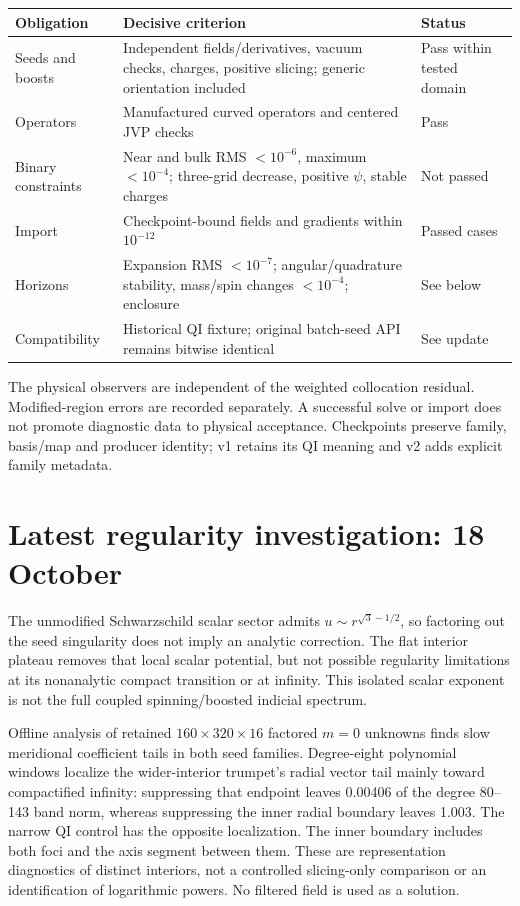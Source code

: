 \documentclass[aps,prd,preprint,notitlepage,nofootinbib]{revtex4-2}
\begin{document}
\begin{center}\footnotesize
\begin{tabularx}{\linewidth}{@{}lXl@{}}
\toprule
Obligation & Decisive criterion & Status\\\midrule
Seeds and boosts & Independent fields/derivatives, vacuum checks, charges,
positive slicing; generic orientation included & Pass within tested domain\\
Operators & Manufactured curved operators and centered JVP checks & Pass\\
Binary constraints & Near and bulk RMS $<10^{-6}$, maximum $<10^{-4}$;
three-grid decrease, positive $\psi$, stable charges & Not passed\\
Import & Checkpoint-bound fields and gradients within $10^{-12}$ & Passed cases\\
Horizons & Expansion RMS $<10^{-7}$; angular/quadrature stability,
mass/spin changes $<10^{-4}$; enclosure & See below\\
Compatibility & Historical QI fixture; original batch-seed API remains bitwise identical & See update\\
\bottomrule
\end{tabularx}
\end{center}
The physical observers are independent of the weighted collocation residual.
Modified-region errors are recorded separately. A successful solve or import
does not promote diagnostic data to physical acceptance. Checkpoints preserve
family, basis/map and producer identity; v1 retains its QI meaning and v2 adds
explicit family metadata.

\section{Latest regularity investigation: 18 October}
The unmodified Schwarzschild scalar sector admits
$u\sim r^{\sqrt3-1/2}$, so factoring out the seed singularity does not imply
an analytic correction. The flat interior plateau removes that local scalar
potential, but not possible regularity limitations at its nonanalytic compact
transition or at infinity. This isolated scalar exponent is not the full
coupled spinning/boosted indicial spectrum.

Offline analysis of retained $160\times320\times16$ factored $m=0$ unknowns
finds slow meridional coefficient tails in both seed families. Degree-eight
polynomial windows localize the wider-interior trumpet's radial vector tail
mainly toward compactified infinity: suppressing that endpoint leaves 0.00406
of the degree 80--143 band norm, whereas suppressing the inner radial boundary
leaves 1.003. The narrow QI control has the opposite localization. The inner
boundary includes both foci and the axis segment between them. These are
representation diagnostics of distinct interiors, not a controlled slicing-only
comparison or an identification of logarithmic powers. No filtered field is
used as a solution.
\end{document}
